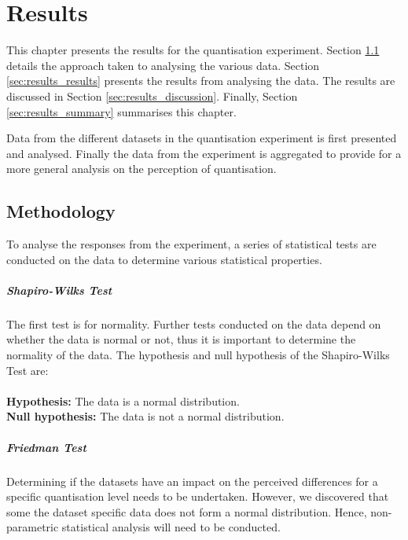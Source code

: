 \graphicspath{{./results/}}

\chapter{Results}
\label{cha:results}

This chapter presents the results for the quantisation experiment. Section
\ref{sec:results_methodology} details the approach taken to analysing the
various data. Section \ref{sec:results_results} presents the results from
analysing the data. The results are discussed in Section
\ref{sec:results_discussion}. Finally, Section \ref{sec:results_summary}
summarises this chapter.

Data from the different datasets in the quantisation experiment is first
presented and analysed. Finally the data from the experiment is aggregated to
provide for a more general analysis on the perception of quantisation.

\section{Methodology}
\label{sec:results_methodology}

To analyse the responses from the experiment, a series of statistical tests are
conducted on the data to determine various statistical properties.

\paragraph{Shapiro-Wilks Test}
The first test is for normality. Further tests conducted on the data depend on
whether the data is normal or not, thus it is important to determine the
normality of the data. The hypothesis and null hypothesis of the Shapiro-Wilks
Test are: \\ \\
\textbf{Hypothesis:} The data is a normal distribution. \\
\textbf{Null hypothesis:} The data is not a normal distribution.

\paragraph{Friedman Test}
Determining if the datasets have an impact on the perceived differences for a
specific quantisation level needs to be undertaken. However, we discovered that
some the dataset specific data does not form a normal distribution. Hence,
non-parametric statistical analysis will need to be conducted.

